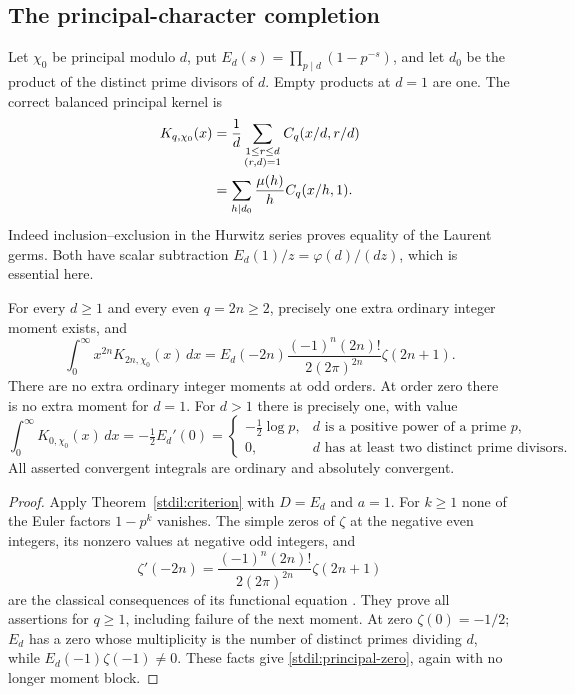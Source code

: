 \subsection{The principal-character completion}

Let $\chi_0$ be principal modulo $d$, put
$E_d(s)=\prod_{p\mid d}(1-p^{-s})$, and let $d_0$ be the product
of the distinct prime divisors of $d$. Empty products at $d=1$ are one.
The correct balanced principal kernel is
\begin{align}
 K_{q,\chi_0}(x)
   &=\frac1d\sum_{\substack{1\le r\le d\\(r,d)=1}}
           C_q(x/d,r/d)\notag\\
   &=\sum_{h\mid d_0}\frac{\mu(h)}h C_q(x/h,1).
      \label{stdil:principal-kernel}
\end{align}
Indeed inclusion--exclusion in the Hurwitz series proves equality
of the Laurent germs. Both have scalar subtraction
$E_d(1)/z=\varphi(d)/(dz)$, which is essential here.

\begin{proposition}
\label{stdil:principal}
For every $d\ge1$ and every even $q=2n\ge2$, precisely one extra
ordinary integer moment exists, and
\begin{equation}\label{stdil:principal-even}
 \int_0^\infty x^{2n}K_{2n,\chi_0}(x)\,dx
  =E_d(-2n)\frac{(-1)^n(2n)!}{2(2\pi)^{2n}}\zeta(2n+1).
\end{equation}
There are no extra ordinary integer moments at odd orders.
At order zero there is no extra moment for $d=1$. For $d>1$
there is precisely one, with value
\begin{equation}\label{stdil:principal-zero}
 \int_0^\infty K_{0,\chi_0}(x)\,dx
   =-\tfrac12 E_d'(0)
   =\begin{cases}-\tfrac12\log p,&d\text{ is a positive power of a prime }p,\\
                  0,&d\text{ has at least two distinct prime divisors}.
     \end{cases}
\end{equation}
All asserted convergent integrals are ordinary and absolutely convergent.
\end{proposition}
\begin{proof}
Apply Theorem~\ref{stdil:criterion} with $D=E_d$ and $a=1$.
For $k\ge1$ none of the Euler factors $1-p^k$ vanishes. The simple
zeros of $\zeta$ at the negative even integers, its nonzero values
at negative odd integers, and
\[
 \zeta'(-2n)=\frac{(-1)^n(2n)!}{2(2\pi)^{2n}}\zeta(2n+1)
\]
are the classical consequences of its functional equation
\cite{stchar:classical}. They prove all assertions for $q\ge1$,
including failure of the next moment. At zero $\zeta(0)=-1/2$;
$E_d$ has a zero whose multiplicity is the number of distinct primes
dividing $d$, while $E_d(-1)\zeta(-1)\ne0$. These facts give
\eqref{stdil:principal-zero}, again with no longer moment block.
\end{proof}
